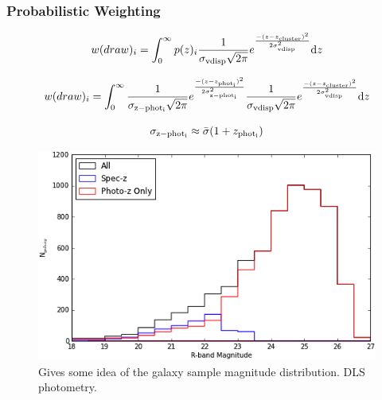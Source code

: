 \subsubsection{Probabilistic Weighting}

\begin{equation}
w(draw)_i = \int_{0}^{\infty} p(z)_i \frac{1}{\sigma_{\rm vdisp}\sqrt{2\pi}}e^{\frac{-(z-z_{\rm cluster})^2}{2\sigma_{\rm vdisp}^2}}\mathrm{d}z
\label{equation:specz_weight}
\end{equation}

\begin{equation}
w(draw)_i = \int_{0}^{\infty} \frac{1}{\sigma_{\rm z-phot_{i}}\sqrt{2\pi}}e^{\frac{-(z-z_{\rm phot_{i}})^2}{2\sigma_{\rm z-phot_{i}}^2}} \frac{1}{\sigma_{\rm vdisp}\sqrt{2\pi}}e^{\frac{-(z-z_{\rm cluster})^2}{2\sigma_{\rm vdisp}^2}}\mathrm{d}z
\label{equation:photoz_weight}
\end{equation}

\begin{equation}
\sigma_{\rm z-phot_{i}} \approx \bar{\sigma}(1+z_{\rm phot_{i}})
\label{equation:SigmazPhot}
\end{equation}

\begin{figure}
	\centering
	\includegraphics[width=6in]{Chapter4/AnalysisFiles/magdist.png}
	\caption[Musket Ball Cluster spectroscopic and photometric magnitude distribution.]{Gives some idea of the galaxy sample magnitude distribution. DLS photometry.
		}
	\label{figure:PhotozSpeczMagDist}
\end{figure}

